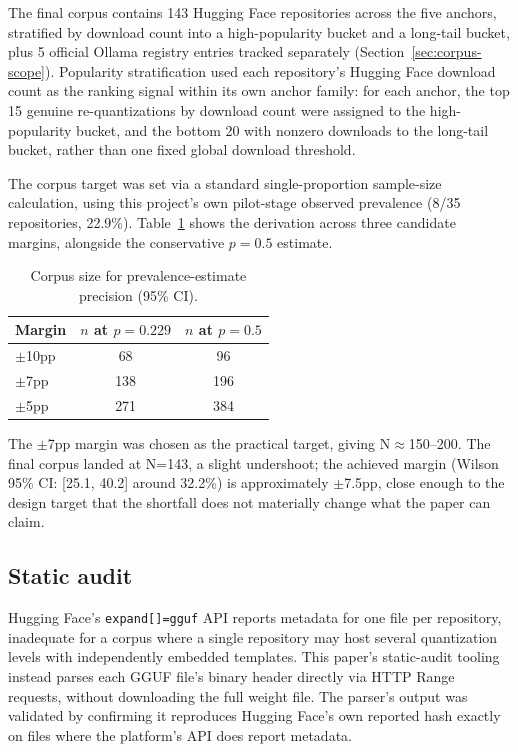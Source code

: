 \documentclass[letterpaper,twocolumn,10pt]{article}
\begin{document}
The final corpus contains 143 Hugging Face repositories across the five anchors, stratified by download count into a high-popularity bucket and a long-tail bucket, plus 5 official Ollama registry entries tracked separately (Section~\ref{sec:corpus-scope}). Popularity stratification used each repository's Hugging Face download count as the ranking signal within its own anchor family: for each anchor, the top 15 genuine re-quantizations by download count were assigned to the high-popularity bucket, and the bottom 20 with nonzero downloads to the long-tail bucket, rather than one fixed global download threshold.

The corpus target was set via a standard single-proportion sample-size calculation, using this project's own pilot-stage observed prevalence (8/35 repositories, 22.9\%). Table~\ref{tab:corpus-size} shows the derivation across three candidate margins, alongside the conservative $p=0.5$ estimate.

\begin{table}[t]
\caption{Corpus size for prevalence-estimate precision (95\% CI).}
\label{tab:corpus-size}
\centering
\small
\begin{tabular}{lcc}
\toprule
Margin & $n$ at $p=0.229$ & $n$ at $p=0.5$ \\
\midrule
$\pm$10pp & 68 & 96 \\
$\pm$7pp & 138 & 196 \\
$\pm$5pp & 271 & 384 \\
\bottomrule
\end{tabular}
\end{table}

The $\pm$7pp margin was chosen as the practical target, giving N$\approx$150--200. The final corpus landed at N=143, a slight undershoot; the achieved margin (Wilson 95\% CI: [25.1, 40.2] around 32.2\%) is approximately $\pm$7.5pp, close enough to the design target that the shortfall does not materially change what the paper can claim.

\subsection{Static audit}

Hugging Face's \texttt{expand[]=gguf} API reports metadata for one file per repository, inadequate for a corpus where a single repository may host several quantization levels with independently embedded templates. This paper's static-audit tooling instead parses each GGUF file's binary header directly via HTTP Range requests, without downloading the full weight file. The parser's output was validated by confirming it reproduces Hugging Face's own reported hash exactly on files where the platform's API does report metadata.
\end{document}
